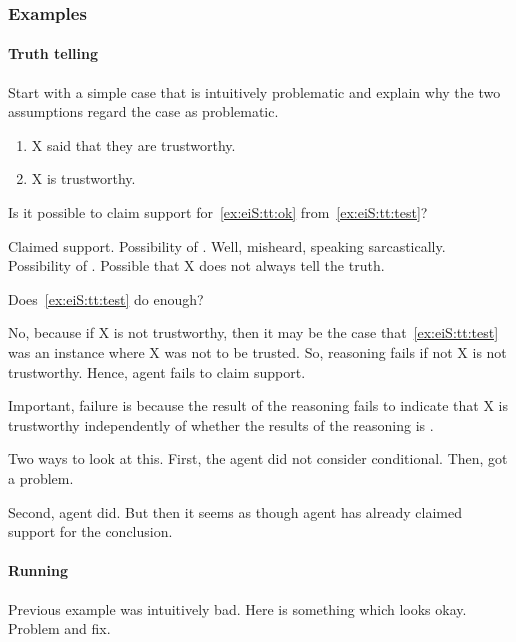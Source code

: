 \subsubsection{Examples}

\paragraph{Truth telling}

\begin{note}
  Start with a simple case that is intuitively problematic and explain why the two assumptions regard the case as problematic.

  \begin{enumerate}[label=\arabic*., ref=(\arabic*)]
  \item\label{ex:eiS:tt:test} X said that they are trustworthy.
  \item\label{ex:eiS:tt:ok} X is trustworthy.
  \end{enumerate}
  Is it possible to claim support for~\ref{ex:eiS:tt:ok} from~\ref{ex:eiS:tt:test}?

  Claimed support.
  Possibility of \mistaken{}.
  Well, misheard, speaking sarcastically.
  Possibility of \misled{}.
  Possible that X does not always tell the truth.

  Does~\ref{ex:eiS:tt:test} do enough?

  No, because if X is not trustworthy, then it may be the case that~\ref{ex:eiS:tt:test} was an instance where X was not to be trusted.
  So, reasoning fails if not X is not trustworthy.
  Hence, agent fails to claim support.

  Important, failure is because the result of the reasoning fails to indicate that X is trustworthy independently of whether the results of the reasoning is \mom{}.


  Two ways to look at this.
  First, the agent did not consider conditional.
  Then, got a problem.

  Second, agent did.
  But then it seems as though agent has already claimed support for the conclusion.
\end{note}

\paragraph{Running}

\begin{note}
  Previous example was intuitively bad.
  Here is something which looks okay.
  Problem and fix.
\end{note}

